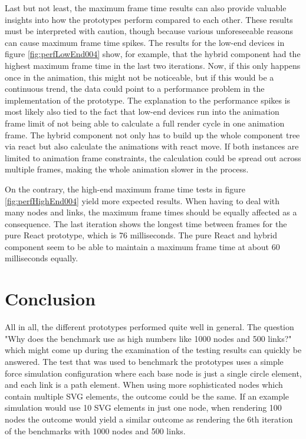 Last but not least, the maximum frame time results can also provide valuable insights into how the prototypes perform compared to each other. These results must be interpreted with caution, though because various unforeseeable reasons can cause maximum frame time spikes. The results for the low-end devices in figure \ref{fig:perfLowEnd004} show, for example, that the hybrid component had the highest maximum frame time in the last two iterations. Now, if this only happens once in the animation, this might not be noticeable, but if this would be a continuous trend, the data could point to a performance problem in the implementation of the prototype. The explanation to the performance spikes is most likely also tied to the fact that low-end devices run into the animation frame limit of not being able to calculate a full render cycle in one animation frame. The hybrid component not only has to build up the whole component tree via react but also calculate the animations with react move. If both instances are limited to animation frame constraints, the calculation could be spread out across multiple frames, making the whole animation slower in the process.

On the contrary, the high-end maximum frame time tests in figure \ref{fig:perfHighEnd004} yield more expected results. When having to deal with many nodes and links, the maximum frame times should be equally affected as a consequence. The last iteration shows the longest time between frames for the pure React prototype, which is 76 milliseconds. The pure React and hybrid component seem to be able to maintain a maximum frame time at about 60 milliseconds equally.


\section{Conclusion}

All in all, the different prototypes performed quite well in general. The question "Why does the benchmark use as high numbers like 1000 nodes and 500 links?" which might come up during the examination of the testing results can quickly be answered. The test that was used to benchmark the prototypes uses a simple force simulation configuration where each base node is just a single circle element, and each link is a path element. When using more sophisticated nodes which contain multiple SVG elements, the outcome could be the same. If an example simulation would use 10 SVG elements in just one node, when rendering 100 nodes the outcome would yield a similar outcome as rendering the 6th iteration of the benchmarks with 1000 nodes and 500 links.

